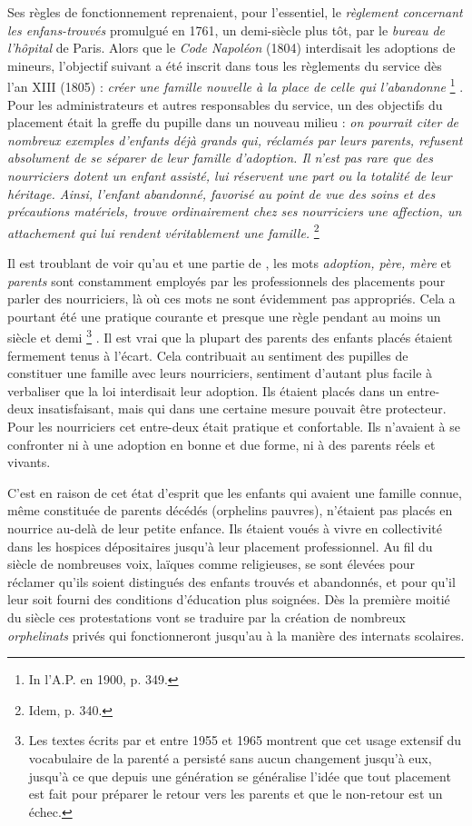  Ses règles de fonctionnement reprenaient, pour l'essentiel, le \emph{règlement concernant les enfans-trouvés} promulgué en 1761, un demi-siècle plus tôt, par le \emph{bureau de l'hôpital} de Paris. Alors que le \emph{Code Napoléon} (1804) interdisait les adoptions de mineurs, l'objectif suivant a été inscrit dans tous les règlements du service dès l'an XIII (1805) : \emph{créer une famille nouvelle à la place de celle qui l'abandonne}%
\footnote{In l'A.P. en 1900, p. 349.}%
. Pour les administrateurs et autres responsables du service, un des objectifs du placement était la greffe du pupille dans un nouveau milieu : \emph{on pourrait citer de nombreux exemples d'enfants déjà grands qui, réclamés par leurs parents, refusent absolument de se séparer de leur famille d'adoption. Il n'est pas rare que des nourriciers dotent un enfant assisté, lui réservent une part ou la totalité de leur héritage. Ainsi, l'enfant abandonné, favorisé au point de vue des soins et des précautions matériels, trouve ordinairement chez ses nourriciers une affection, un attachement qui lui rendent véritablement une famille.}%
\footnote{Idem, p. 340.} 

 Il est troublant de voir qu'au  et une partie de , les mots \emph{adoption, père, mère} et \emph{parents} sont constamment employés par les professionnels des placements pour parler des nourriciers, là où ces mots ne sont évidemment pas appropriés. Cela a pourtant été une pratique courante et presque une règle pendant au moins un siècle et demi%
\footnote{Les textes écrits par  et  entre 1955 et 1965 montrent que cet usage extensif du vocabulaire de la parenté a persisté sans aucun changement jusqu'à eux, jusqu'à ce que depuis une génération se généralise l'idée que tout placement est fait pour préparer le retour vers les parents et que le non-retour est un échec.}%
. Il est vrai que la plupart des parents des enfants placés étaient fermement tenus à l'écart. Cela contribuait au sentiment des pupilles de constituer une famille avec leurs nourriciers, sentiment d'autant plus facile à verbaliser que la loi interdisait leur adoption. Ils étaient placés dans un entre-deux insatisfaisant, mais qui dans une certaine mesure pouvait être protecteur. Pour les nourriciers cet entre-deux était pratique et confortable. Ils n'avaient à se confronter ni à une adoption en bonne et due forme, ni à des parents réels et vivants. 

 C'est en raison de cet état d'esprit que les enfants qui avaient une famille connue, même constituée de parents décédés (orphelins pauvres), n'étaient pas placés en nourrice au-delà de leur petite enfance. Ils étaient voués à vivre en collectivité dans les hospices dépositaires jusqu'à leur placement professionnel. Au fil du siècle de nombreuses voix, laïques comme religieuses, se sont élevées pour réclamer qu'ils soient distingués des enfants trouvés et abandonnés, et pour qu'il leur soit fourni des conditions d'éducation plus soignées. Dès la première moitié du siècle ces protestations vont se traduire par la création de nombreux \emph{orphelinats} privés qui fonctionneront jusqu'au  à la manière des internats scolaires. 

